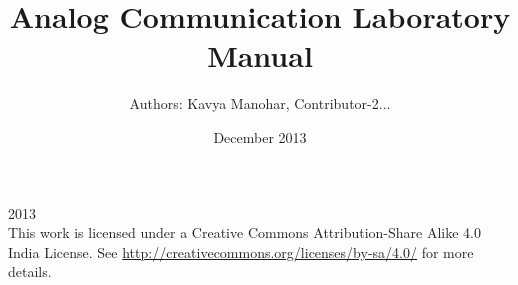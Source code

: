 \documentclass{book}
\begin{document}
\thispagestyle{empty}
\thispagestyle{empty}

\title{Analog Communication
Laboratory Manual}
\date{December 2013}
\author {Authors: Kavya Manohar, Contributor-2...}
\maketitle
  
\textcopyright{}2013
\\[5cm]
    This work is licensed under a Creative Commons Attribution-Share Alike 4.0 India License. See \url{http://creativecommons.org/licenses/by-sa/4.0/} for more details.






\thispagestyle{empty}
\tableofcontents
\thispagestyle{empty}
\thispagestyle{empty}

\listoffigures
\thispagestyle{empty}

















\end{document}
